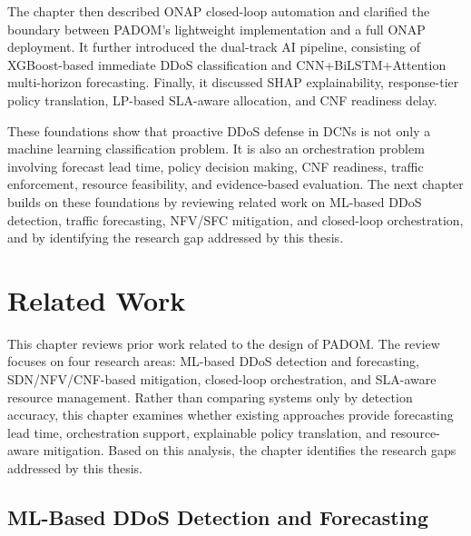 \documentclass[12pt, a4paper, reqno, oneside]{book}
\newcommand{\padonap}{\textsc{PADOM}}
\begin{document}
The chapter then described ONAP closed-loop automation and clarified the
boundary between \padonap{}'s lightweight implementation and a full ONAP
deployment. It further introduced the dual-track AI pipeline, consisting of
XGBoost-based immediate DDoS classification and CNN+BiLSTM+Attention
multi-horizon forecasting. Finally, it discussed SHAP explainability,
response-tier policy translation, LP-based SLA-aware allocation, and CNF
readiness delay.

These foundations show that proactive DDoS defense in DCNs is not only a
machine learning classification problem. It is also an orchestration problem
involving forecast lead time, policy decision making, CNF readiness, traffic
enforcement, resource feasibility, and evidence-based evaluation. The next
chapter builds on these foundations by reviewing related work on ML-based DDoS
detection, traffic forecasting, NFV/SFC mitigation, and closed-loop
orchestration, and by identifying the research gap addressed by this thesis.
\chapter{Related Work}
\label{ch:related}

This chapter reviews prior work related to the design of \padonap{}. The
review focuses on four research areas: ML-based DDoS detection and forecasting,
SDN/NFV/CNF-based mitigation, closed-loop orchestration, and SLA-aware resource
management. Rather than comparing systems only by detection accuracy, this
chapter examines whether existing approaches provide forecasting lead time,
orchestration support, explainable policy translation, and resource-aware
mitigation. Based on this analysis, the chapter identifies the research gaps
addressed by this thesis.

\section{ML-Based DDoS Detection and Forecasting}
\label{sec:related-ml}
\end{document}
